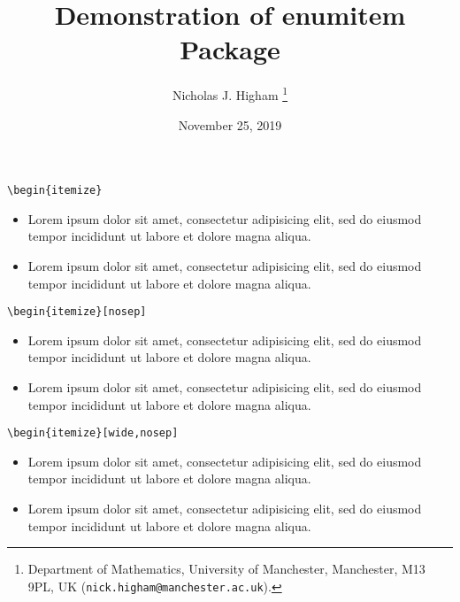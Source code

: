 \documentclass[12pt]{article}
\title{Demonstration of enumitem Package}
\author{Nicholas J. Higham%
        \thanks{%
                Department of Mathematics,
                University of Manchester,
                Manchester, M13 9PL, UK
                (\texttt{nick.higham@manchester.ac.uk}).
               }
}
\date{November 25, 2019}
\begin{document}
\thispagestyle{empty}
\maketitle

\begin{verbatim}
\begin{itemize}
\end{verbatim}
\begin{itemize}

\item 
Lorem ipsum dolor sit amet, consectetur adipisicing elit, sed do
eiusmod tempor incididunt ut labore et dolore magna aliqua. 

\item 
Lorem ipsum dolor sit amet, consectetur adipisicing elit, sed do
eiusmod tempor incididunt ut labore et dolore magna aliqua. 

\end{itemize}

\begin{verbatim}
\begin{itemize}[nosep]
\end{verbatim}
\begin{itemize}[nosep]

\item 
Lorem ipsum dolor sit amet, consectetur adipisicing elit, sed do
eiusmod tempor incididunt ut labore et dolore magna aliqua. 

\item 
Lorem ipsum dolor sit amet, consectetur adipisicing elit, sed do
eiusmod tempor incididunt ut labore et dolore magna aliqua. 

\end{itemize}

\begin{verbatim}
\begin{itemize}[wide,nosep]
\end{verbatim}
\begin{itemize}[wide,nosep]

\item 
Lorem ipsum dolor sit amet, consectetur adipisicing elit, sed do
eiusmod tempor incididunt ut labore et dolore magna aliqua. 

\item 
Lorem ipsum dolor sit amet, consectetur adipisicing elit, sed do
eiusmod tempor incididunt ut labore et dolore magna aliqua. 

\end{itemize}
\end{document}
